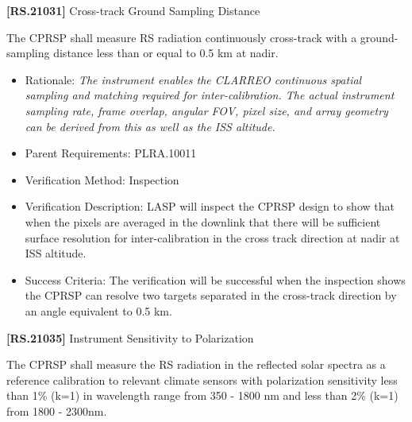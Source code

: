 \documentclass[12pt,oneside,oldfontcommands]{memoir}
\begin{document}
\textbf{[RS.21031]} Cross-track Ground Sampling Distance

The \gls{CPRSP} shall \gls{measure} \gls{RS} radiation continuously cross-track with a ground-sampling distance less than or equal to 0.5 km at nadir.

\begin{itemize}
\item{} Rationale: \emph{The instrument enables the CLARREO continuous spatial sampling and matching required for inter-calibration. The actual instrument sampling rate, frame overlap, angular FOV, pixel size, and array geometry can be derived from this as well as the ISS altitude.}

\item{} Parent Requirements: PLRA.10011

\item{} Verification Method: Inspection

\item{} Verification Description: \gls{LASP} will inspect the \gls{CPRSP} design to show that when the pixels are averaged in the downlink that there will be sufficient surface resolution for inter-calibration in the cross track direction at nadir at \gls{ISS} altitude.

\item{} Success Criteria: The verification will be successful when the \gls{inspection} shows the \gls{CPRSP} can resolve two targets separated in the cross-track direction by an angle equivalent to 0.5 km.

\end{itemize}

\textbf{[RS.21035]} Instrument Sensitivity to Polarization

The \gls{CPRSP} shall \gls{measure} the \gls{RS} radiation in the reflected solar spectra as a reference calibration to relevant climate sensors with polarization sensitivity less than 1\% (k=1) in wavelength range from 350 - 1800 nm and less than 2\% (k=1) from 1800 - 2300nm.
\end{document}
